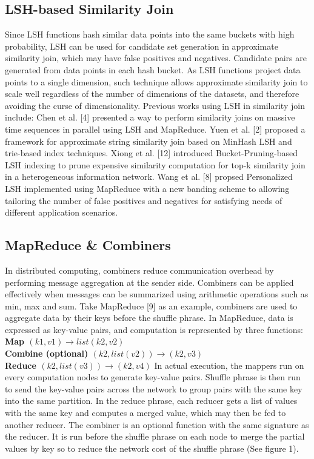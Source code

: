 \documentclass{vldb}
\begin{document}
\subsection{LSH-based Similarity Join}
Since LSH functions hash similar data points into the same buckets with high probability, LSH can be used for candidate set generation in approximate similarity join, which may have false positives and negatives. Candidate pairs are generated from data points in each hash bucket. As LSH functions project data points to a single dimension, such technique allows approximate similarity join to scale well regardless of the number of dimensions of the datasets, and therefore avoiding the curse of dimensionality. Previous works using LSH in similarity join include:
Chen et al. [4] presented a way to perform similarity joins on massive time sequences in parallel using LSH and MapReduce. Yuen et al. [2] proposed a framework for approximate string similarity join based on MinHash LSH and trie-based index techniques. Xiong et al. [12] introduced Bucket-Pruning-based LSH indexing to prune expensive similarity computation for top-k similarity join in a heterogeneous information network. Wang et al. [8] propsed Personalized LSH implemented using MapReduce with a new banding scheme to allowing tailoring the number of false positives and negatives for satisfying needs of different application scenarios.


\subsection{MapReduce \& Combiners}
In distributed computing, combiners reduce communication overhead by performing message aggregation at the sender side. Combiners can be applied effectively when messages can be summarized using arithmetic operations such as min, max and sum. Take MapReduce [9] as an example, combiners are used to aggregate data by their keys before the shuffle phrase. In MapReduce, data is expressed as key-value pairs, and computation is represented by three functions:\\
	\indent\indent\indent\textbf{Map					$(k1, v1)		\to	list(k2, v2)$}\\
	\indent\indent\indent\textbf{Combine (optional)		$(k2, list(v2))	\to	(k2, v3)$}\\
	\indent\indent\indent\textbf{Reduce				$(k2, list(v3))	\to	(k2, v4)$}
In actual execution, the mappers run on every computation nodes to generate key-value pairs. Shuffle phrase is then run to send the key-value pairs across the network to group pairs with the same key into the same partition. In the reduce phrase, each reducer gets a list of values with the same key and computes a merged value, which may then be fed to another reducer. The combiner is an optional function with the same signature as the reducer. It is run before the shuffle phrase on each node to merge the partial values by key so to reduce the network cost of the shuffle phrase (See figure 1).
\end{document}
